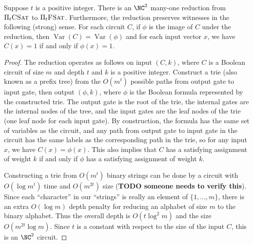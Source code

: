 \documentclass{article}
\newcommand{\todo}[1]{\textbf{TODO #1}}
\newcommand{\PiFSAT}{\Pi_t \textsc{FSat}}
\newcommand{\PiCSAT}{\Pi_t \textsc{CSat}}
\DeclareMathOperator{\Var}{Var}
\begin{document}
\begin{lemma}\label{lem:circuittoformula}
  Suppose $t$ is a positive integer.
  There is an $\NC^2$ many-one reduction from $\PiCSAT$ to $\PiFSAT$.
  Furthermore, the reduction preserves witnesses in the following (strong) sense.
  For each circuit $C$, if $\phi$ is the image of $C$ under the reduction, then $\Var(C) = \Var(\phi)$ and for each input vector $x$, we have $C(x) = 1$ if and only if $\phi(x) = 1$.
\end{lemma}
\begin{proof}
  The reduction operates as follows on input $(C, k)$, where $C$ is a Boolean circuit of size $m$ and depth $t$ and $k$ is a positive integer.
  Construct a trie (also known as a prefix tree) from the $O(m^t)$ possible paths from output gate to input gate, then output $(\phi, k)$, where $\phi$ is the Boolean formula represented by the constructed trie.
  The output gate is the root of the trie, the internal gates are the internal nodes of the tree, and the input gates are the leaf nodes of the trie (one leaf node for each input gate).
  By construction, the formula has the same set of variables as the circuit, and any path from output gate to input gate in the circuit has the same labels as the corresponding path in the trie, so for any input $x$, we have $C(x) = \phi(x)$.
  This also implies that $C$ has a satisfying assignment of weight $k$ if and only if $\phi$ has a satisfying assignment of weight $k$.

  Constructing a trie from $O(m^t)$ binary strings can be done by a circuit with $O(\log m^t)$ time and $O(m^{2t})$ size \autocite{lv86} (\todo{someone needs to verify this}).
  Since each ``character'' in our ``strings'' is really an element of $\{1, \dotsc, m\}$, there is an extra $O(\log m)$ depth penalty for reducing an alphabet of size $m$ to the binary alphabet.
  Thus the overall depth is $O(t \log^2 m)$ and the size $O(m^{2t} \log m)$.
  Since $t$ is a constant with respect to the size of the input $C$, this is an $\NC^2$ circuit.
\end{proof}
\end{document}
